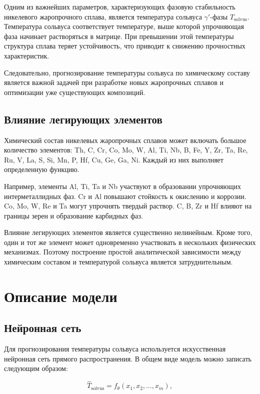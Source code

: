 Одним из важнейших параметров, характеризующих фазовую стабильность 
никелевого жаропрочного сплава, является температура сольвуса 
$\gamma'$-фазы $T_{\mathrm{solvus}}$. Температура сольвуса соответствует 
температуре, выше которой упрочняющая фаза начинает растворяться в 
матрице. При превышении этой температуры структура сплава теряет 
устойчивость, что приводит к снижению прочностных характеристик.

Следовательно, прогнозирование температуры сольвуса по химическому 
составу является важной задачей при разработке новых жаропрочных 
сплавов и оптимизации уже существующих композиций.

\subsection{Влияние легирующих элементов}

Химический состав никелевых жаропрочных сплавов может включать 
большое количество элементов: Th, C, Cr, Co, Mo, W, Al, Ti, Nb, B, 
Fe, Y, Zr, Ta, Re, Ru, V, La, S, Si, Mn, P, Hf, Cu, Ge, Ga, Ni. 
Каждый из них выполняет определенную функцию.

Например, элементы Al, Ti, Ta и Nb участвуют в образовании 
упрочняющих интерметаллидных фаз. Cr и Al повышают стойкость к 
окислению и коррозии. Co, Mo, W, Re и Ta могут упрочнять твердый 
раствор. C, B, Zr и Hf влияют на границы зерен и образование карбидных фаз.

Влияние легирующих элементов является существенно нелинейным. Кроме 
того, один и тот же элемент может одновременно участвовать в нескольких 
физических механизмах. Поэтому построение простой аналитической 
зависимости между химическим составом и температурой сольвуса 
является затруднительным.

\section{Описание модели}

\subsection{Нейронная сеть}

Для прогнозирования температуры сольвуса используется искусственная 
нейронная сеть прямого распространения. В общем виде модель можно 
записать следующим образом:

\begin{equation}
\hat{T}_{\mathrm{solvus}} =
f_{\theta}
\left(
x_1, x_2, \ldots, x_m
\right),
\end{equation}

